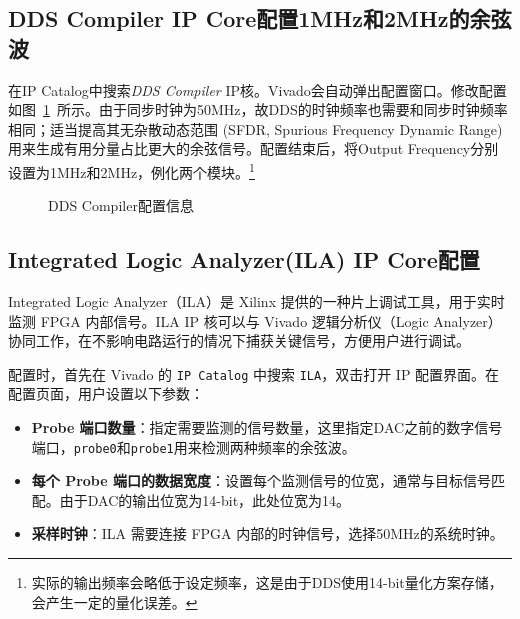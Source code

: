 \documentclass[lang=cn,newtx,10pt,scheme=chinese]{elegantbook}
\begin{document}
\subsection{DDS Compiler IP Core配置1MHz和2MHz的余弦波}
在IP Catalog中搜索\textit{DDS Compiler} IP核。Vivado会自动弹出配置窗口。修改配置如图~\ref{fig:exp3:dds-1}~所示。由于同步时钟为50MHz，故DDS的时钟频率也需要和同步时钟频率相同；适当提高其无杂散动态范围 (SFDR, Spurious Frequency Dynamic Range)用来生成有用分量占比更大的余弦信号。配置结束后，将Output Frequency分别设置为1MHz和2MHz，例化两个模块。\footnote{实际的输出频率会略低于设定频率，这是由于DDS使用14-bit量化方案存储，会产生一定的量化误差。}
\begin{figure}[htbp]
  \centering
  \hfill
  \caption{DDS Compiler配置信息}
  \label{fig:exp3:dds-1}
\end{figure}

\subsection{Integrated Logic Analyzer(ILA) IP Core配置}

Integrated Logic Analyzer（ILA）是 Xilinx 提供的一种片上调试工具，用于实时监测 FPGA 内部信号。ILA IP 核可以与 Vivado 逻辑分析仪（Logic Analyzer）协同工作，在不影响电路运行的情况下捕获关键信号，方便用户进行调试。

配置时，首先在 Vivado 的 \texttt{IP Catalog} 中搜索 \texttt{ILA}，双击打开 IP 配置界面。在配置页面，用户设置以下参数：
\begin{itemize}
    \item \textbf{Probe 端口数量}：指定需要监测的信号数量，这里指定DAC之前的数字信号端口，\texttt{probe0}和\texttt{probe1}用来检测两种频率的余弦波。
    \item \textbf{每个 Probe 端口的数据宽度}：设置每个监测信号的位宽，通常与目标信号匹配。由于DAC的输出位宽为14-bit，此处位宽为14。
    \item \textbf{采样时钟}：ILA 需要连接 FPGA 内部的时钟信号，选择50MHz的系统时钟。
\end{itemize}
\end{document}
